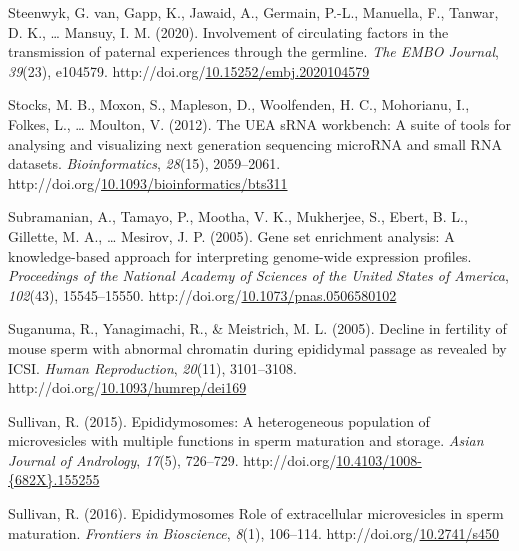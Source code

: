 \documentclass[12pt,twoside]{reedthesis}
\newlength{\cslhangindent}
\newenvironment{CSLReferences}[2] %
 {%
  \setlength{\parindent}{0pt}
  \ifodd #1 \everypar{\setlength{\hangindent}{\cslhangindent}}\ignorespaces\fi
  \ifnum #2 > 0
  \setlength{\parskip}{#2\baselineskip}
  \fi
 }%
 {}
\begin{document}
\begin{CSLReferences}{1}{0}
\leavevmode{}%
Steenwyk, G. van, Gapp, K., Jawaid, A., Germain, P.-L., Manuella, F., Tanwar, D. K., \ldots{} Mansuy, I. M. (2020). Involvement of circulating factors in the transmission of paternal experiences through the germline. \emph{The {EMBO} Journal}, \emph{39}(23), e104579. http://doi.org/\href{https://doi.org/10.15252/embj.2020104579}{10.15252/embj.2020104579}

\leavevmode{}%
Stocks, M. B., Moxon, S., Mapleson, D., Woolfenden, H. C., Mohorianu, I., Folkes, L., \ldots{} Moulton, V. (2012). The UEA sRNA workbench: A suite of tools for analysing and visualizing next generation sequencing microRNA and small RNA datasets. \emph{Bioinformatics}, \emph{28}(15), 2059--2061. http://doi.org/\href{https://doi.org/10.1093/bioinformatics/bts311}{10.1093/bioinformatics/bts311}

\leavevmode{}%
Subramanian, A., Tamayo, P., Mootha, V. K., Mukherjee, S., Ebert, B. L., Gillette, M. A., \ldots{} Mesirov, J. P. (2005). Gene set enrichment analysis: A knowledge-based approach for interpreting genome-wide expression profiles. \emph{Proceedings of the National Academy of Sciences of the United States of America}, \emph{102}(43), 15545--15550. http://doi.org/\href{https://doi.org/10.1073/pnas.0506580102}{10.1073/pnas.0506580102}

\leavevmode{}%
Suganuma, R., Yanagimachi, R., \& Meistrich, M. L. (2005). Decline in fertility of mouse sperm with abnormal chromatin during epididymal passage as revealed by {ICSI}. \emph{Human Reproduction}, \emph{20}(11), 3101--3108. http://doi.org/\href{https://doi.org/10.1093/humrep/dei169}{10.1093/humrep/dei169}

\leavevmode{}%
Sullivan, R. (2015). Epididymosomes: A heterogeneous population of microvesicles with multiple functions in sperm maturation and storage. \emph{Asian Journal of Andrology}, \emph{17}(5), 726--729. http://doi.org/\href{https://doi.org/10.4103/1008-\%7B682X\%7D.155255}{10.4103/1008-\{682X\}.155255}

\leavevmode{}%
Sullivan, R. (2016). Epididymosomes Role of extracellular microvesicles in sperm maturation. \emph{Frontiers in Bioscience}, \emph{8}(1), 106--114. http://doi.org/\href{https://doi.org/10.2741/s450}{10.2741/s450}


\end{CSLReferences}
\end{document}

